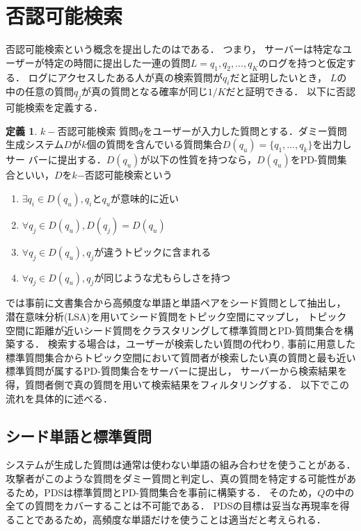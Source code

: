 \documentclass[master]{suribt}
\theoremstyle{definition}
\newtheorem{defi}[thm]{定義}
\begin{document}
 \section{否認可能検索}\label{s:PDS}
 否認可能検索という概念を提出したのは\cite{}である．
 つまり， サーバーは特定なユーザーが特定の時間に提出した一連の質問$L = {q_1, q_2, \dots , q_K}$のログを持つと仮定する． 
 ログにアクセスしたある人が真の検索質問が$q_i$だと証明したいとき， $L$の中の任意の質問$q_j$が真の質問となる確率が同じ$1/K$だと証明できる．
 以下に否認可能検索を定義する．
 \begin{defi}{$k−$否認可能検索}
 	質問$q$をユーザーが入力した質問とする．ダミー質問生成システム$D$が$k$個の質問を含んでいる質問集合$D(q_u)=\{q_1, \dots , q_k\}$を出力しサー
	バーに提出する．$D(q_u)$が以下の性質を持つなら，$D(q_u)$をPD-質問集合といい，$D$を$k$−否認可能検索という
	\begin{enumerate}
	\item $\exists q_i \in D(q_u),q_i$と$q_u$が意味的に近い
	\item $\forall q_j \in D(q_u),D(q_j) = D(q_u)$
	\item $\forall q_j \in D(q_u),q_j$が違うトピックに含まれる
	\item $\forall q_j \in D(q_u),q_j$が同じような尤もらしさを持つ
	\end{enumerate}
  \end{defi}
 \cite{providing2009}では事前に文書集合から高頻度な単語と単語ペアをシード質問として抽出し，
 潜在意味分析(LSA)\cite{}を用いてシード質問をトピック空間にマップし，
 トピック空間に距離が近いシード質問をクラスタリングして標準質問とPD-質問集合を構築する．
 検索する場合は，ユーザーが検索したい質問の代わり,
 事前に用意した標準質問集合からトピック空間において質問者が検索したい真の質問と最も近い標準質問が属するPD-質問集合をサーバーに提出し，
 サーバーから検索結果を得，質問者側で真の質問を用いて検索結果をフィルタリングする．
 以下でこの流れを具体的に述べる．
 \subsection{シード単語と標準質問}
 システムが生成した質問は通常は使わない単語の組み合わせを使うことがある．
 攻撃者がこのような質問をダミー質問と判定し、真の質問を特定する可能性があるため，PDSは標準質問とPD-質問集合を事前に構築する．
 そのため，$Q$の中の全ての質問をカバーすることは不可能である．
 PDSの目標は妥当な再現率を得ることであるため，高頻度な単語だけを使うことは適当だと考えられる．
 
\end{document}
